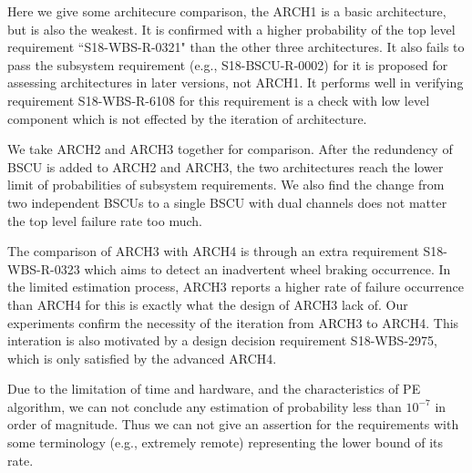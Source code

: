 Here we give some architecure comparison, the ARCH1 is a basic architecture, but is also the weakest. It is confirmed with a higher probability of the top level requirement ``S18-WBS-R-0321" than the other three architectures. It also fails to pass the subsystem requirement (e.g., S18-BSCU-R-0002) for it is proposed for assessing architectures in later versions, not ARCH1. It performs well in verifying requirement S18-WBS-R-6108 for this requirement is a check with low level component which is not effected by the iteration of architecture.

We take ARCH2 and ARCH3 together for comparison. After the redundency of BSCU is added to ARCH2 and ARCH3, the two architectures reach the lower limit of probabilities of subsystem requirements. We also find the change from two independent BSCUs to a single BSCU with dual channels does not matter the top level failure rate too much. 


The comparison of ARCH3 with ARCH4 is through an extra requirement S18-WBS-R-0323 which aims to detect an inadvertent wheel braking occurrence. In the limited estimation process, ARCH3 reports a higher rate of failure occurrence than ARCH4 for this is exactly what the design of ARCH3 lack of. Our experiments confirm the necessity of the iteration from ARCH3 to ARCH4. This interation is also motivated by a design decision requirement S18-WBS-2975, which is only satisfied by the advanced ARCH4.

Due to the limitation of time and hardware, and the characteristics of PE algorithm, we can not conclude any estimation of probability less than $10^{-7}$ in order of magnitude. Thus we can not give an assertion for the requirements with some terminology (e.g., extremely remote) representing the lower bound of its rate.

